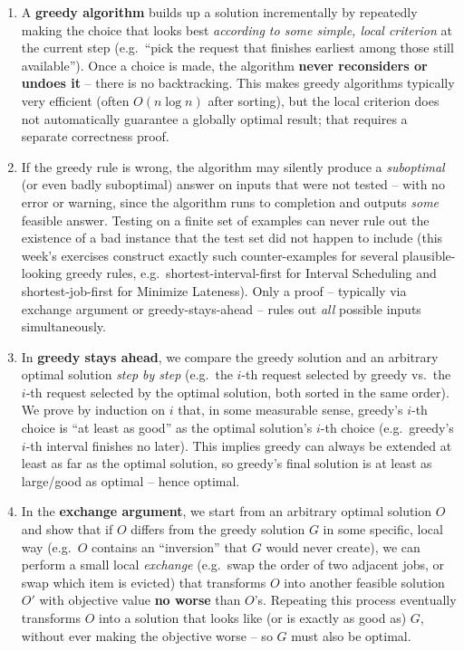 \documentclass[11pt]{article}
\begin{document}
\begin{enumerate}[label=\textbf{A\arabic*.}, leftmargin=2.2em]

\item A \textbf{greedy algorithm} builds up a solution incrementally by repeatedly making
the choice that looks best \emph{according to some simple, local criterion} at the current
step (e.g.\ ``pick the request that finishes earliest among those still available''). Once
a choice is made, the algorithm \textbf{never reconsiders or undoes it} -- there is no
backtracking. This makes greedy algorithms typically very efficient (often $O(n \log n)$
after sorting), but the local criterion does not automatically guarantee a globally
optimal result; that requires a separate correctness proof.

\item If the greedy rule is wrong, the algorithm may silently produce a \emph{suboptimal}
(or even badly suboptimal) answer on inputs that were not tested -- with no error or
warning, since the algorithm runs to completion and outputs \emph{some} feasible answer.
Testing on a finite set of examples can never rule out the existence of a bad instance
that the test set did not happen to include (this week's exercises construct exactly such
counter-examples for several plausible-looking greedy rules, e.g.\ shortest-interval-first
for Interval Scheduling and shortest-job-first for Minimize Lateness). Only a proof --
typically via exchange argument or greedy-stays-ahead -- rules out \emph{all} possible
inputs simultaneously.

\item In \textbf{greedy stays ahead}, we compare the greedy solution and an arbitrary
optimal solution \emph{step by step} (e.g.\ the $i$-th request selected by greedy vs.\ the
$i$-th request selected by the optimal solution, both sorted in the same order). We prove
by induction on $i$ that, in some measurable sense, greedy's $i$-th choice is ``at least
as good'' as the optimal solution's $i$-th choice (e.g.\ greedy's $i$-th interval finishes
no later). This implies greedy can always be extended at least as far as the optimal
solution, so greedy's final solution is at least as large/good as optimal -- hence
optimal.

\item In the \textbf{exchange argument}, we start from an arbitrary optimal solution $O$
and show that if $O$ differs from the greedy solution $G$ in some specific, local way
(e.g.\ $O$ contains an ``inversion'' that $G$ would never create), we can perform a small
local \emph{exchange} (e.g.\ swap the order of two adjacent jobs, or swap which item is
evicted) that transforms $O$ into another feasible solution $O'$ with objective value
\textbf{no worse} than $O$'s. Repeating this process eventually transforms $O$ into a
solution that looks like (or is exactly as good as) $G$, without ever making the objective
worse -- so $G$ must also be optimal.


\end{enumerate}
\end{document}

